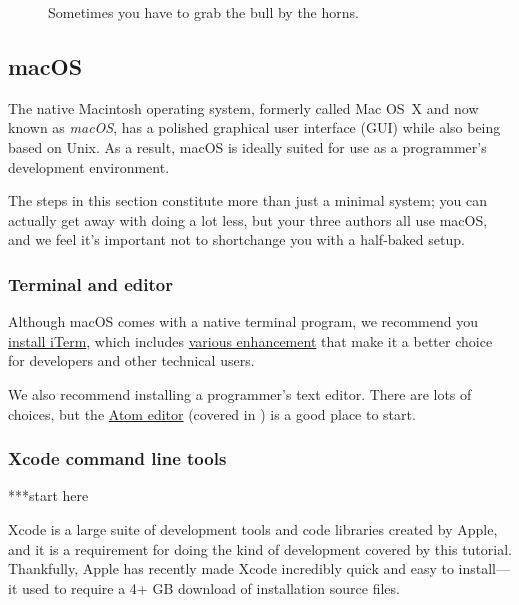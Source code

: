 \begin{figure}
\begin{center}
\end{center}
\caption{Sometimes you have to grab the bull by the horns.\label{fig:grab_bull_by_horns}}
\end{figure}

\subsection{macOS} %
\label{sec:macos}

The native Macintosh operating system, formerly called Mac OS~X and now known as \emph{macOS}, has a polished graphical user interface (GUI) while also being based on Unix. As a result, macOS is ideally suited for use as a  programmer's development environment.

The steps in this section constitute more than just a minimal system; you can actually get away with doing a lot less, but your three authors all use macOS, and we feel it's important not to shortchange you with a half-baked setup.

\subsubsection{Terminal and editor} %
\label{sec:terminal_and_editor}

Although macOS comes with a native terminal program, we recommend you \href{\href{https://www.iterm2.com/downloads.html}{iTerm}}{install iTerm}, which includes \href{https://www.iterm2.com/features.html}{various enhancement} that make it a better choice for developers and other technical users.

We also recommend installing a programmer's text editor. There are lots of choices, but the \href{https://atom.io/}{Atom editor} (covered in ) is a good place to start.



\subsubsection{Xcode command line tools}
\label{sec:shiny_xcode}

***start here

Xcode is a large suite of development tools and code libraries created by Apple, and it is a requirement for doing the kind of development covered by this tutorial. Thankfully, Apple has recently made Xcode incredibly quick and easy to install---it used to require a 4+ GB download of installation source files.

